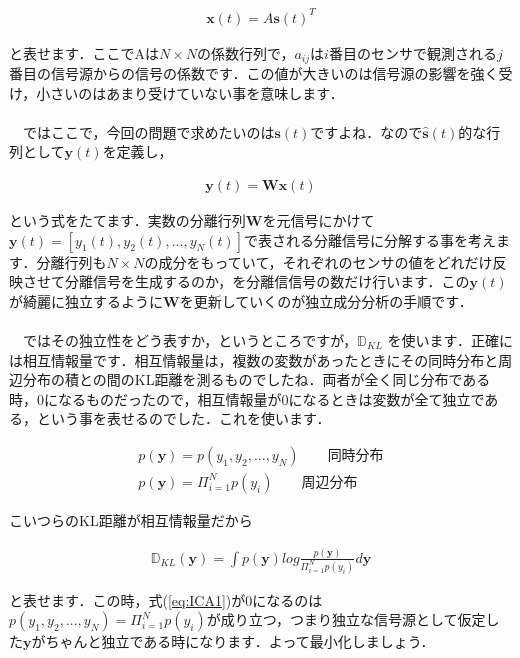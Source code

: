 \documentclass[11pt,a4paper,uplatex]{ujreport}
\begin{document}
\begin{eqnarray}
\mathbf{x}(t) = A \mathbf{s}(t)^T
\end{eqnarray}

と表せます．ここでAは$N\times N$の係数行列で，$a_{ij}$は$i$番目のセンサで観測される$j$番目の信号源からの信号の係数です．この値が大きいのは信号源の影響を強く受け，小さいのはあまり受けていない事を意味します．\\
\\

　ではここで，今回の問題で求めたいのは$\mathbf{s}(t)$ですよね．なので$\hat{\mathbf{s}}(t)$的な行列として$\mathbf{y}(t)$を定義し，

\begin{eqnarray}
\mathbf{y}(t) = \mathbf{W} \mathbf{x}(t)
\end{eqnarray}

という式をたてます．実数の分離行列$\mathbf{W}$を元信号にかけて$\mathbf{y}(t) = [y_1(t), y_2(t),...,y_N(t)]$で表される分離信号に分解する事を考えます．分離行列も$N\times N$の成分をもっていて，それぞれのセンサの値をどれだけ反映させて分離信号を生成するのか，を分離信信号の数だけ行います．この$\mathbf{y}(t)$が綺麗に独立するように$\mathbf{W}$を更新していくのが独立成分分析の手順です．\\
\\
　ではその独立性をどう表すか，というところですが，$\mathbb{D}_{KL}$ を使います．正確には相互情報量です．相互情報量は，複数の変数があったときにその同時分布と周辺分布の積との間のKL距離を測るものでしたね．両者が全く同じ分布である時，0になるものだったので，相互情報量が0になるときは変数が全て独立である，という事を表せるのでした．これを使います．

\begin{eqnarray}
p (\mathbf{y}) = p(y_1, y_2,...,y_N) \qquad \text{同時分布}\\
p (\mathbf{y}) = \Pi_{i=1}^N p(y_i) \qquad \text{周辺分布}
\end{eqnarray}

こいつらのKL距離が相互情報量だから

\begin{eqnarray}
\label{eq:ICA1}
\mathbb{D}_{KL}(\mathbf{y}) = \int p(\mathbf{y}) log \frac{p(\mathbf{y})}{\Pi_{i=1}^N p(y_i)} d\mathbf{y}
\end{eqnarray}

と表せます．この時，式(\ref{eq:ICA1})が0になるのは$p(y_1, y_2,...,y_N) =\Pi_{i=1}^N p(y_i) $が成り立つ，つまり独立な信号源として仮定した$\mathbf{y}$がちゃんと独立である時になります．よって最小化しましょう．\\
\end{document}
